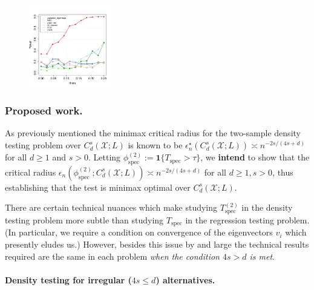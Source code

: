 \documentclass{article}
\newcommand{\1}{\mathbf{1}}
\theoremstyle{alden}
\theoremstyle{aldenthm}
\theoremstyle{definition}
\theoremstyle{remark}
\begin{document}
\begin{figure}
	\includegraphics[width=0.32\textwidth]{plots/stepfunction_sin3_theta}
\end{figure}

\subsubsection{Proposed work.}

As previously mentioned the minimax critical radius for the two-sample density testing problem over $C_d^{s}(\mathcal{X};L)$ is known to be $\epsilon_n^{\star}(C_d^{s}(\mathcal{X};L)) \asymp n^{-2s/(4s + d)}$ for all $d \geq 1$ and $s > 0$. Letting $\phi_{\mathrm{spec}}^{(2)} := \1\{T_{\mathrm{spec}} > \tau\}$, we \textbf{intend} to show that the critical radius $\epsilon_n(\phi_{\mathrm{spec}}^{(2)};C_d^{s}(\mathcal{X};L)) \asymp n^{-2s/(4s + d)}$ for all $d \geq 1, s > 0$, thus establishing that the test is minimax optimal over $C_d^{s}(\mathcal{X};L)$.

There are certain technical nuances which make studying $T_{\mathrm{spec}}^{(2)}$ in the density testing problem more subtle than studying $T_{\mathrm{spec}}$ in the regression testing problem. (In particular, we require a condition on convergence of the eigenvectors ${v_i}$ which presently eludes us.) However, besides this issue by and large the technical results required are the same in each problem \emph{when the condition $4s > d$ is met}.

\paragraph{Density testing for irregular ($4s \leq d$) alternatives.}
\end{document}
